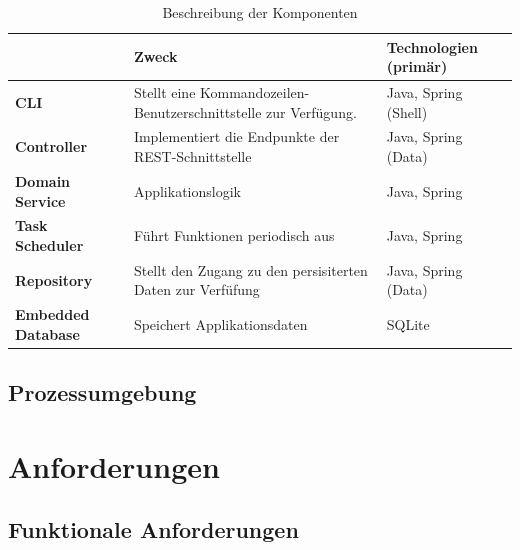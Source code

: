 \documentclass[a4paper,12pt]{report}
\begin{document}
    \begin{table}[h!]
        \centering
        \setlength{\leftmargini}{0.4cm}
        \begin{tabular}{|p{2.5cm}|p{5.5cm}|p{3cm}|}
            \hline
            \textbf& \textbf{Zweck} & \textbf{Technologien (primär)} \\
            \hline
            \textbf{CLI} & {Stellt eine Kommandozeilen-Benutzerschnittstelle zur Verfügung.} & Java, Spring (Shell) \\
            \hline
            \textbf{Controller} & Implementiert die Endpunkte der REST-Schnittstelle & Java, Spring (Data) \\
            \hline
            \textbf{Domain Service} & Applikationslogik & Java, Spring \\
            \hline
            \textbf{Task Scheduler} & Führt Funktionen periodisch aus & Java, Spring \\
            \hline
            \textbf{Repository} & Stellt den Zugang zu den persisiterten Daten zur Verfüfung & Java, Spring (Data) \\
            \hline
            \textbf{Embedded Database} & Speichert Applikationsdaten & SQLite \\
            \hline
        \end{tabular}
        \caption{Beschreibung der Komponenten}\label{tab:table3}
    \end{table}

    \newpage

    \subsection{Prozessumgebung}

    \newpage
    \section{Anforderungen}
    \subsection{Funktionale Anforderungen}
\end{document}
